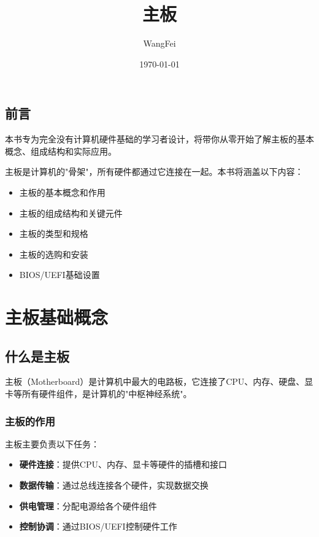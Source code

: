 \documentclass[12pt,UTF8]{ctexbook}
\title{\heiti\zihao{0} 主板}
\author{WangFei}
\date{\today}
\begin{document}
\maketitle
\tableofcontents

\frontmatter
\chapter{前言}

本书专为完全没有计算机硬件基础的学习者设计，将带你从零开始了解主板的基本概念、组成结构和实际应用。

主板是计算机的"骨架"，所有硬件都通过它连接在一起。本书将涵盖以下内容：
\begin{itemize}
    \item 主板的基本概念和作用
    \item 主板的组成结构和关键元件
    \item 主板的类型和规格
    \item 主板的选购和安装
    \item BIOS/UEFI基础设置
\end{itemize}

\mainmatter

\part{主板基础概念}

\chapter{什么是主板}

主板（Motherboard）是计算机中最大的电路板，它连接了CPU、内存、硬盘、显卡等所有硬件组件，是计算机的"中枢神经系统"。

\section{主板的作用}

主板主要负责以下任务：

\begin{itemize}[leftmargin=2em]
    \item \textbf{硬件连接}：提供CPU、内存、显卡等硬件的插槽和接口
    \item \textbf{数据传输}：通过总线连接各个硬件，实现数据交换
    \item \textbf{供电管理}：分配电源给各个硬件组件
    \item \textbf{控制协调}：通过BIOS/UEFI控制硬件工作
\end{itemize}
\end{document}
